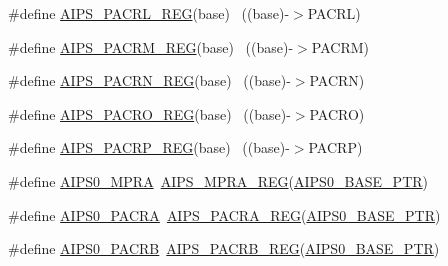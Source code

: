 \begin{DoxyCompactItemize}
\item 
\#define \hyperlink{group___a_i_p_s___register___accessor___macros_ga9f0835d43f92a09467da7cae7f5a602f}{A\+I\+P\+S\+\_\+\+P\+A\+C\+R\+L\+\_\+\+R\+EG}(base)                                      ~((base)-\/$>$P\+A\+C\+RL)
\item 
\#define \hyperlink{group___a_i_p_s___register___accessor___macros_ga85c559319333d83c01a7dcea1ac14bad}{A\+I\+P\+S\+\_\+\+P\+A\+C\+R\+M\+\_\+\+R\+EG}(base)                                      ~((base)-\/$>$P\+A\+C\+RM)
\item 
\#define \hyperlink{group___a_i_p_s___register___accessor___macros_gaa794b17b9de6a81bd01fc3bdeeafc5b2}{A\+I\+P\+S\+\_\+\+P\+A\+C\+R\+N\+\_\+\+R\+EG}(base)                                      ~((base)-\/$>$P\+A\+C\+RN)
\item 
\#define \hyperlink{group___a_i_p_s___register___accessor___macros_ga41ac26d457af78568e03b65f4ed71c71}{A\+I\+P\+S\+\_\+\+P\+A\+C\+R\+O\+\_\+\+R\+EG}(base)                                      ~((base)-\/$>$P\+A\+C\+RO)
\item 
\#define \hyperlink{group___a_i_p_s___register___accessor___macros_gadf1bac253f22b305685fdd87564a7660}{A\+I\+P\+S\+\_\+\+P\+A\+C\+R\+P\+\_\+\+R\+EG}(base)                                      ~((base)-\/$>$P\+A\+C\+RP)
\item 
\#define \hyperlink{group___a_i_p_s___register___accessor___macros_ga41bb0ce77a71c841504362985bac06d6}{A\+I\+P\+S0\+\_\+\+M\+P\+RA}~\hyperlink{group___a_i_p_s___register___accessor___macros_ga152616308133cf4081eccd2218dcc92f}{A\+I\+P\+S\+\_\+\+M\+P\+R\+A\+\_\+\+R\+EG}(\hyperlink{group___a_i_p_s___peripheral_ga6affb22d1dff0d01c843913f33f1c1a9}{A\+I\+P\+S0\+\_\+\+B\+A\+S\+E\+\_\+\+P\+TR})
\item 
\#define \hyperlink{group___a_i_p_s___register___accessor___macros_ga6567afc8512229ae0e8fa1c13de5e80d}{A\+I\+P\+S0\+\_\+\+P\+A\+C\+RA}~\hyperlink{group___a_i_p_s___register___accessor___macros_ga34c1a4290c1592d146062320c02a9a6a}{A\+I\+P\+S\+\_\+\+P\+A\+C\+R\+A\+\_\+\+R\+EG}(\hyperlink{group___a_i_p_s___peripheral_ga6affb22d1dff0d01c843913f33f1c1a9}{A\+I\+P\+S0\+\_\+\+B\+A\+S\+E\+\_\+\+P\+TR})
\item 
\#define \hyperlink{group___a_i_p_s___register___accessor___macros_gaf0044809fbb0507944350e5e21ace986}{A\+I\+P\+S0\+\_\+\+P\+A\+C\+RB}~\hyperlink{group___a_i_p_s___register___accessor___macros_ga9ef244a0063130484f0c49a3d504fc5b}{A\+I\+P\+S\+\_\+\+P\+A\+C\+R\+B\+\_\+\+R\+EG}(\hyperlink{group___a_i_p_s___peripheral_ga6affb22d1dff0d01c843913f33f1c1a9}{A\+I\+P\+S0\+\_\+\+B\+A\+S\+E\+\_\+\+P\+TR})

\end{DoxyCompactItemize}
